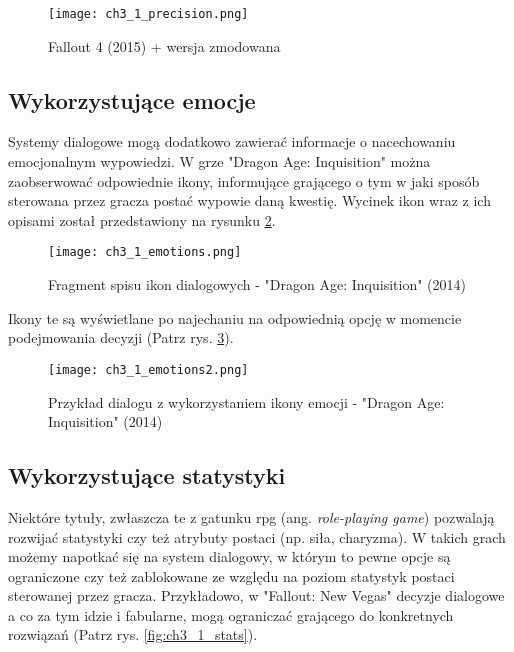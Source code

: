 \begin{figure}[h]
    \texttt{[image: ch3\_1\_precision.png]}
    \caption{Fallout 4 (2015) + wersja zmodowana\cite{spoken_conversational_ai}}
    \centering
    \label{fig:ch3_1_precision}
\end{figure}

\newpage

\subsection{Wykorzystujące emocje}

Systemy dialogowe mogą dodatkowo zawierać informacje o nacechowaniu emocjonalnym wypowiedzi.
W grze "Dragon Age: Inquisition" można zaobserwować odpowiednie ikony, informujące grającego o
tym w jaki sposób sterowana przez gracza postać wypowie daną kwestię. Wycinek ikon wraz z ich
opisami został przedstawiony na rysunku \ref{fig:ch3_1_emotions_list}.

\begin{figure}[h]
    \centering
    \texttt{[image: ch3\_1\_emotions.png]}
    \caption{Fragment spisu ikon dialogowych - "Dragon Age: Inquisition" (2014)\cite{dragon_age_fandom}}
    \label{fig:ch3_1_emotions_list}
\end{figure}

Ikony te są wyświetlane po najechaniu na odpowiednią opcję w momencie podejmowania decyzji
(Patrz rys. \ref{fig:ch3_1_emotions_example}).

\begin{figure}[h]
    \texttt{[image: ch3\_1\_emotions2.png]}
    \caption{Przykład dialogu z wykorzystaniem ikony emocji - "Dragon Age: Inquisition" (2014)}
    \centering
    \label{fig:ch3_1_emotions_example}
\end{figure}

\subsection{Wykorzystujące statystyki}

Niektóre tytuły, zwłaszcza te z gatunku \gls{rpg} (ang. \textit{role-playing game}) pozwalają rozwijać
statystyki czy też atrybuty postaci (np. siła, charyzma). W takich grach możemy napotkać się na
system dialogowy, w którym to pewne opcje są ograniczone czy też zablokowane ze względu na poziom
statystyk postaci sterowanej przez gracza. Przykładowo, w "Fallout: New Vegas" decyzje dialogowe
a co za tym idzie i fabularne, mogą ograniczać grającego do konkretnych rozwiązań
(Patrz rys. \ref{fig:ch3_1_stats}).

